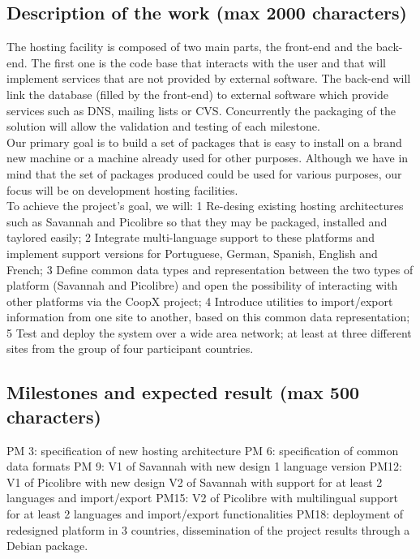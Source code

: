 \documentclass[a4paper,11pt]{report}
\begin{document}
\subsection*{Description of the work (max 2000 characters)}
The hosting facility is composed of two main parts, the front-end and the
back-end. The first one is the code base that interacts with the user and that
will implement services that are not provided by external software. The
back-end will link the database (filled by the front-end) to external
software which
provide services such as DNS, mailing lists or CVS. Concurrently the packaging
of the solution will allow the validation and testing of each milestone.\\
Our primary goal is to build a set of packages that is easy to
install on a brand new machine or a machine already used for other
purposes. 
Although we have in mind that the set of packages produced could be used for
various purposes, our focus will be on development hosting facilities. \\

To achieve the project's goal, we will: 
1 Re-desing existing hosting architectures such as Savannah and Picolibre 
  so that they may be packaged, installed and taylored easily; 
2 Integrate multi-language support to these platforms and implement support
  versions for Portuguese, German, Spanish, English and French;
3 Define common data types and representation between the two types of
  platform (Savannah and Picolibre) and open the possibility of interacting
  with other platforms via the CoopX project;
4 Introduce utilities to import/export information from one site to
  another, based on this common data representation;
5 Test and deploy the system over a wide area network; at least at three
  different sites from the group of four participant countries.
\subsection*{Milestones and expected result (max 500 characters)}
PM 3: specification of new hosting architecture
PM 6: specification of common data formats
PM 9: V1 of Savannah with new design 1 language version
PM12: V1 of Picolibre with new design
      V2 of Savannah with support for at least 2 languages and import/export
PM15: V2 of Picolibre with multilingual support for at least 2 languages and
      import/export functionalities
PM18: deployment of redesigned platform in 3 countries, 
      dissemination of the project results through a Debian package.
\end{document}
